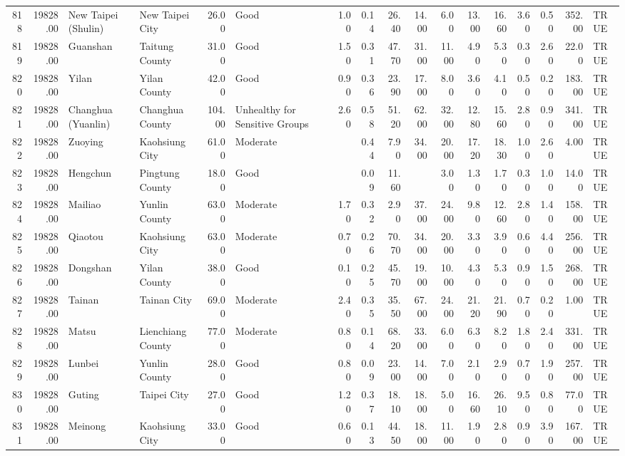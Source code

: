 \begin{table}[ht]
\begin{tabular}{rrllrlrrrrrrrrrrl}
  818 & 19828.00 & New Taipei (Shulin) & New Taipei City & 26.00 & Good & 1.00 & 0.14 & 26.40 & 14.00 & 6.00 & 13.00 & 16.60 & 3.60 & 0.50 & 352.00 & TRUE \\ 
  819 & 19828.00 & Guanshan & Taitung County & 31.00 & Good & 1.50 & 0.31 & 47.70 & 31.00 & 11.00 & 4.90 & 5.30 & 0.30 & 2.60 & 22.00 & TRUE \\ 
  820 & 19828.00 & Yilan & Yilan County & 42.00 & Good & 0.90 & 0.36 & 23.90 & 17.00 & 8.00 & 3.60 & 4.10 & 0.50 & 0.20 & 183.00 & TRUE \\ 
  821 & 19828.00 & Changhua (Yuanlin) & Changhua County & 104.00 & Unhealthy for Sensitive Groups & 2.60 & 0.58 & 51.20 & 62.00 & 32.00 & 12.80 & 15.60 & 2.80 & 0.90 & 341.00 & TRUE \\ 
  822 & 19828.00 & Zuoying & Kaohsiung City & 61.00 & Moderate &  & 0.44 & 7.90 & 34.00 & 20.00 & 17.20 & 18.30 & 1.00 & 2.60 & 4.00 & TRUE \\ 
  823 & 19828.00 & Hengchun & Pingtung County & 18.00 & Good &  & 0.09 & 11.60 &  & 3.00 & 1.30 & 1.70 & 0.30 & 1.00 & 14.00 & TRUE \\ 
  824 & 19828.00 & Mailiao & Yunlin County & 63.00 & Moderate & 1.70 & 0.32 & 2.90 & 37.00 & 24.00 & 9.80 & 12.60 & 2.80 & 1.40 & 158.00 & TRUE \\ 
  825 & 19828.00 & Qiaotou & Kaohsiung City & 63.00 & Moderate & 0.70 & 0.26 & 70.70 & 34.00 & 20.00 & 3.30 & 3.90 & 0.60 & 4.40 & 256.00 & TRUE \\ 
  826 & 19828.00 & Dongshan & Yilan County & 38.00 & Good & 0.10 & 0.25 & 45.70 & 19.00 & 10.00 & 4.30 & 5.30 & 0.90 & 1.50 & 268.00 & TRUE \\ 
  827 & 19828.00 & Tainan & Tainan City & 69.00 & Moderate & 2.40 & 0.35 & 35.50 & 67.00 & 24.00 & 21.20 & 21.90 & 0.70 & 0.20 & 1.00 & TRUE \\ 
  828 & 19828.00 & Matsu & Lienchiang County & 77.00 & Moderate & 0.80 & 0.14 & 68.20 & 33.00 & 6.00 & 6.30 & 8.20 & 1.80 & 2.40 & 331.00 & TRUE \\ 
  829 & 19828.00 & Lunbei & Yunlin County & 28.00 & Good & 0.80 & 0.09 & 23.00 & 14.00 & 7.00 & 2.10 & 2.90 & 0.70 & 1.90 & 257.00 & TRUE \\ 
  830 & 19828.00 & Guting & Taipei City & 27.00 & Good & 1.20 & 0.37 & 18.10 & 18.00 & 5.00 & 16.60 & 26.10 & 9.50 & 0.80 & 77.00 & TRUE \\ 
  831 & 19828.00 & Meinong & Kaohsiung City & 33.00 & Good & 0.60 & 0.13 & 44.50 & 18.00 & 11.00 & 1.90 & 2.80 & 0.90 & 3.90 & 167.00 & TRUE \\ 

\end{tabular}
\end{table}

